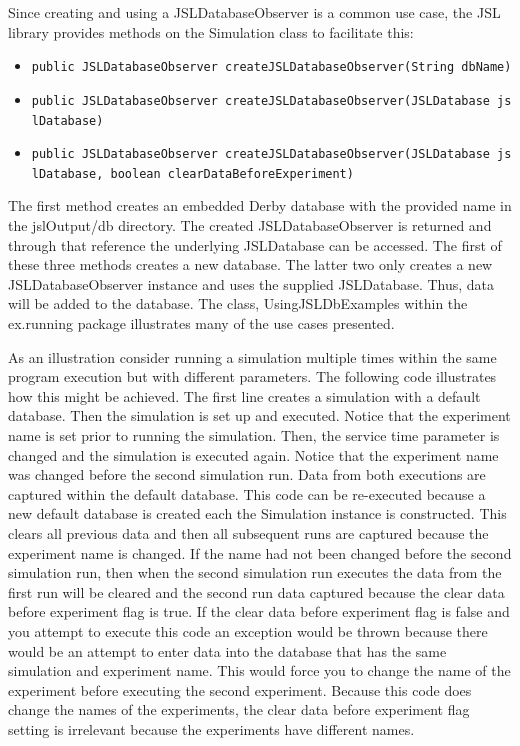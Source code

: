 \documentclass[
]{book}
\providecommand{\tightlist}{%
  \setlength{\itemsep}{0pt}\setlength{\parskip}{0pt}}
\theoremstyle{definition}
\theoremstyle{definition}
\theoremstyle{definition}
\theoremstyle{definition}
\theoremstyle{remark}
\begin{document}
Since creating and using a JSLDatabaseObserver is a common use case, the
JSL library provides methods on the Simulation class to facilitate this:

\begin{itemize}
\tightlist
\item
  \texttt{public\ JSLDatabaseObserver\ createJSLDatabaseObserver(String\ dbName)}
\item
  \texttt{public\ JSLDatabaseObserver\ createJSLDatabaseObserver(JSLDatabase\ jslDatabase)}
\item
  \texttt{public\ JSLDatabaseObserver\ createJSLDatabaseObserver(JSLDatabase\ jslDatabase,\ boolean\ clearDataBeforeExperiment)}
\end{itemize}

The first method creates an embedded Derby database with the provided
name in the jslOutput/db directory. The created JSLDatabaseObserver is
returned and through that reference the underlying JSLDatabase can be
accessed. The first of these three methods creates a new database. The
latter two only creates a new JSLDatabaseObserver instance and uses the
supplied JSLDatabase. Thus, data will be added to the database. The
class, UsingJSLDbExamples within the ex.running package illustrates many
of the use cases presented.

As an illustration consider running a simulation multiple times within
the same program execution but with different parameters. The following
code illustrates how this might be achieved. The first line creates a
simulation with a default database. Then the simulation is set up and
executed. Notice that the experiment name is set prior to running the
simulation. Then, the service time parameter is changed and the
simulation is executed again. Notice that the experiment name was
changed before the second simulation run. Data from both executions are
captured within the default database. This code can be re-executed
because a new default database is created each the Simulation instance
is constructed. This clears all previous data and then all subsequent
runs are captured because the experiment name is changed. If the name
had not been changed before the second simulation run, then when the
second simulation run executes the data from the first run will be
cleared and the second run data captured because the clear data before
experiment flag is true. If the clear data before experiment flag is
false and you attempt to execute this code an exception would be thrown
because there would be an attempt to enter data into the database that
has the same simulation and experiment name. This would force you to
change the name of the experiment before executing the second
experiment. Because this code does change the names of the experiments,
the clear data before experiment flag setting is irrelevant because the
experiments have different names.
\end{document}
